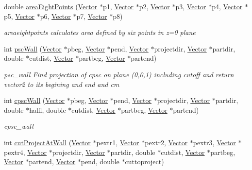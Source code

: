 \begin{DoxyCompactItemize}
double \hyperlink{class_total_energy_calculator_a45ad49b5c9e4fd20cde632c228ac1114}{area\+Eight\+Points} (\hyperlink{class_vector}{Vector} $\ast$p1, \hyperlink{class_vector}{Vector} $\ast$p2, \hyperlink{class_vector}{Vector} $\ast$p3, \hyperlink{class_vector}{Vector} $\ast$p4, \hyperlink{class_vector}{Vector} $\ast$p5, \hyperlink{class_vector}{Vector} $\ast$p6, \hyperlink{class_vector}{Vector} $\ast$p7, \hyperlink{class_vector}{Vector} $\ast$p8)
\begin{DoxyCompactList}\small\item\em areaeightpoints calculates area defined by six points in z=0 plane \end{DoxyCompactList}\item 
int \hyperlink{class_total_energy_calculator_a41e962b0b531514d13ed5197f1ec21e7}{psc\+Wall} (\hyperlink{class_vector}{Vector} $\ast$pbeg, \hyperlink{class_vector}{Vector} $\ast$pend, \hyperlink{class_vector}{Vector} $\ast$projectdir, \hyperlink{class_vector}{Vector} $\ast$partdir, double $\ast$cutdist, \hyperlink{class_vector}{Vector} $\ast$partbeg, \hyperlink{class_vector}{Vector} $\ast$partend)
\begin{DoxyCompactList}\small\item\em psc\+\_\+wall Find projection of cpsc on plane (0,0,1) including cutoff and return vector2 to its begining and end and cm \end{DoxyCompactList}\item 
int \hyperlink{class_total_energy_calculator_a5a8e2104a52069da69d55e8e73b912e1}{cpsc\+Wall} (\hyperlink{class_vector}{Vector} $\ast$pbeg, \hyperlink{class_vector}{Vector} $\ast$pend, \hyperlink{class_vector}{Vector} $\ast$projectdir, \hyperlink{class_vector}{Vector} $\ast$partdir, double $\ast$halfl, double $\ast$cutdist, \hyperlink{class_vector}{Vector} $\ast$partbeg, \hyperlink{class_vector}{Vector} $\ast$partend)
\begin{DoxyCompactList}\small\item\em cpsc\+\_\+wall \end{DoxyCompactList}\item 
int \hyperlink{class_total_energy_calculator_a846388c0d124ff2952c9c4446e250d56}{cut\+Project\+At\+Wall} (\hyperlink{class_vector}{Vector} $\ast$pextr1, \hyperlink{class_vector}{Vector} $\ast$pextr2, \hyperlink{class_vector}{Vector} $\ast$pextr3, \hyperlink{class_vector}{Vector} $\ast$pextr4, \hyperlink{class_vector}{Vector} $\ast$projectdir, \hyperlink{class_vector}{Vector} $\ast$partdir, double $\ast$cutdist, \hyperlink{class_vector}{Vector} $\ast$partbeg, \hyperlink{class_vector}{Vector} $\ast$partend, \hyperlink{class_vector}{Vector} $\ast$pend, double $\ast$cuttoproject)

\end{DoxyCompactItemize}
